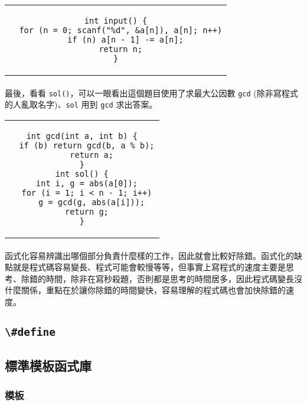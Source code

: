 \documentclass[12pt,a4paper,oneside]{report}
\begin{document}
\begin{CJK}{UTF8}{bkai}
\begin{code}[h!]
\centering
\begin{tabular}{c}
\begin{lstlisting}
int input() {
  for (n = 0; scanf("%d", &a[n]), a[n]; n++)
    if (n) a[n - 1] -= a[n];
  return n;
}
\end{lstlisting}
\end{tabular}
\caption{函式化範例 (\lstinline!input! 部分)}
\label{program:struct:code:input:function:example:input}
\end{code}

\paragraph{}最後，看看 \lstinline!sol()!，可以一眼看出這個題目使用了求最大公因數 \lstinline!gcd! (除非寫程式的人亂取名字)、\lstinline!sol! 用到 \lstinline!gcd! 求出答案。

\begin{code}[h!]
\centering
\begin{tabular}{c}
\begin{lstlisting}
int gcd(int a, int b) {
  if (b) return gcd(b, a % b);
    return a;
}
int sol() {
  int i, g = abs(a[0]);
  for (i = 1; i < n - 1; i++)
    g = gcd(g, abs(a[i]));
  return g;
}
\end{lstlisting}
\end{tabular}
\caption{函式化範例 (\lstinline!sol! 部分)}
\label{program:struct:code:input:function:example:sol}
\end{code}

\paragraph{}函式化容易辨識出哪個部分負責什麼樣的工作，因此就會比較好除錯。函式化的缺點就是程式碼容易變長、程式可能會較慢等等，但事實上寫程式的速度主要是思考、除錯的時間，除非在寫秒殺題，否則都是思考的時間居多，因此程式碼變長沒什麼關係，重點在於讓你除錯的時間變快，容易理解的程式碼也會加快除錯的速度。

\subsection{\lstinline!\#define!}

\subsection{標準模板函式庫}
\subsubsection{模板}


\end{CJK}
\end{document}
